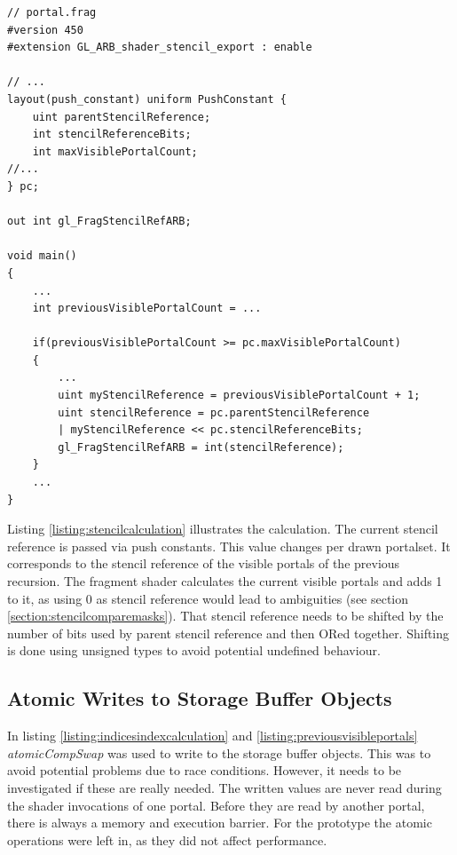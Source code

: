 \begin{lstlisting}[caption={Calculate Stencil Reference in Shader}, label=listing:stencilcalculation]
// portal.frag
#version 450
#extension GL_ARB_shader_stencil_export : enable

// ...
layout(push_constant) uniform PushConstant {	
	uint parentStencilReference;
	int stencilReferenceBits;
	int maxVisiblePortalCount;
//...
} pc;

out int gl_FragStencilRefARB;

void main()
{
	...
	int previousVisiblePortalCount = ...
	
	if(previousVisiblePortalCount >= pc.maxVisiblePortalCount)
	{
		...
		uint myStencilReference = previousVisiblePortalCount + 1;
		uint stencilReference = pc.parentStencilReference 
		| myStencilReference << pc.stencilReferenceBits;
		gl_FragStencilRefARB = int(stencilReference);
	}	
	...
}
\end{lstlisting}

Listing \ref{listing:stencilcalculation} illustrates the calculation. The current stencil reference is passed via push constants. This value changes per drawn \gls{portalset}. It corresponds to the stencil reference of the visible portals of the previous recursion. The fragment shader calculates the current visible portals and adds 1 to it, as using 0 as stencil reference would lead to ambiguities (see section \ref{section:stencilcomparemasks}). That stencil reference needs to be shifted by the number of bits used by parent stencil reference and then ORed together. Shifting is done using unsigned types to avoid potential undefined behaviour.

\subsection{Atomic Writes to Storage Buffer Objects}
In listing \ref{listing:indicesindexcalculation} and \ref{listing:previousvisibleportals} \textit{atomicCompSwap} was used to write to the storage buffer objects. This was to avoid potential problems due to race conditions. However, it needs to be investigated if these are really needed. The written values are never read during the shader invocations of one portal. Before they are read by another portal, there is always a memory and execution barrier. For the prototype the atomic operations were left in, as they did not affect performance.

